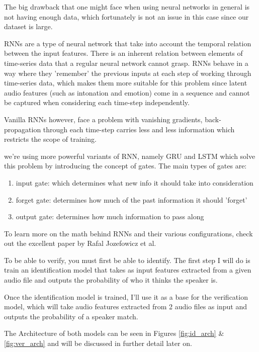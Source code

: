 \documentclass{article}
\begin{document}
The big drawback that one might face when using neural networks in general is not having enough data, which fortunately is not an issue in this case since our dataset is large.

RNNs are a type of neural network that take into account the temporal relation between the input features. There is an inherent relation between elements of time-series data that a regular neural network cannot grasp. RNNs behave in a way where they 'remember' the previous inputs at each step of working through time-series data, which makes them more suitable for this problem since latent audio features (such as intonation and emotion) come in a sequence and cannot be captured when considering each time-step independently.

Vanilla RNNs however, face a problem with vanishing gradients, back-propagation through each time-step carries less and less information which restricts the scope of training.

we're using more powerful variants of RNN, namely GRU and LSTM which solve this problem by introducing the concept of gates. 
The main types of gates are:
\begin{enumerate}
    \item input gate: which determines what new info it should take into consideration
    \item forget gate: determines how much of the past information it should 'forget'
    \item output gate: determines how much information to pass along
\end{enumerate}
To learn more on the math behind RNNs and their various configurations, check out the excellent paper by Rafal Jozefowicz et al.\cite{45473}

\vspace{5mm}

To be able to verify, you must first be able to identify. The first step I will do is train an identification model that takes as input features extracted from a given audio file and outputs the probability of who it thinks the speaker is.

Once the identification model is trained, I'll use it as a base for the verification model, which will take audio features extracted from 2 audio files as input and outputs the probability of a speaker match.

The Architecture of both models can be seen in Figures \ref{fig:id_arch} \& \ref{fig:ver_arch} and will be discussed in further detail later on.
\end{document}
